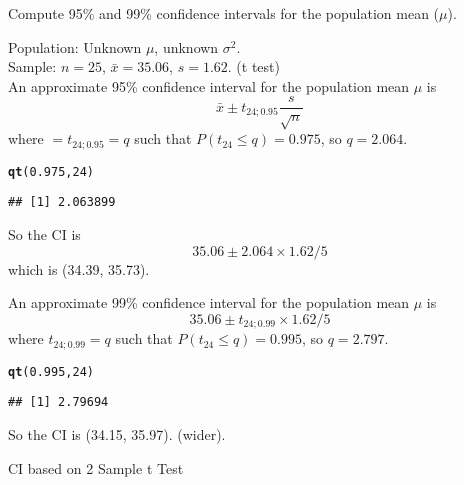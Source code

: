 \documentclass[bigtut]{tutorial}\usepackage[]{graphicx}\usepackage[]{color}
\makeatletter
\newcommand{\hlnum}[1]{\textcolor[rgb]{0.686,0.059,0.569}{#1}}%
\newcommand{\hlstd}[1]{\textcolor[rgb]{0.345,0.345,0.345}{#1}}%
\newcommand{\hlkwd}[1]{\textcolor[rgb]{0.737,0.353,0.396}{\textbf{#1}}}%
\newenvironment{kframe}{%
 \def\at@end@of@kframe{}%
 \ifinner\ifhmode%
  \def\at@end@of@kframe{\end{minipage}}%
  \begin{minipage}{\columnwidth}%
 \fi\fi%
 \def\FrameCommand##1{\hskip\@totalleftmargin \hskip-\fboxsep
 \colorbox{shadecolor}{##1}\hskip-\fboxsep
     \hskip-\linewidth \hskip-\@totalleftmargin \hskip\columnwidth}%
 \MakeFramed {\advance\hsize-\width
   \@totalleftmargin\z@ \linewidth\hsize
   \@setminipage}}%
 {\par\unskip\endMakeFramed%
 \at@end@of@kframe}
\newenvironment{knitrout}{}{} %
\makeatother
\begin{document}
\begin{tutorial}
\begin{questions}
\vspace{.5cm}
Compute 95\% and 99\% confidence intervals for the population mean ($\mu$).


\begin{solution}
Population: Unknown $\mu$, unknown $\sigma^2$. \\
Sample: $n=25$, $\bar{x} = 35.06$, $s=1.62$. (t test) \\

An approximate 95\% confidence interval for the population mean $\mu$ is
\[
\bar x \pm t_{24; 0.95}  \frac{ s }{ \sqrt{n}}
\]
where $=t_{24;0.95} = q$ such that $P(t_{24} \leq q) = 0.975$, so $q=2.064$. \\


\begin{knitrout}
\color{fgcolor}\begin{kframe}
\begin{alltt}
\hlkwd{qt}\hlstd{(}\hlnum{0.975}\hlstd{,}\hlnum{24}\hlstd{)}
\end{alltt}
\begin{verbatim}
## [1] 2.063899
\end{verbatim}
\end{kframe}
\end{knitrout}


So the CI is 
\[  35.06 \pm 2.064  \times 1.62/5\]
which is (34.39, 35.73).

An approximate 99\% confidence interval for the population mean $\mu$ is
\[  35.06 \pm t_{24; 0.99}  \times 1.62/5\]
where $t_{24;0.99} = q$ such that $P(t_{24} \leq q) = 0.995$, so $q=2.797$. \\


\begin{knitrout}
\color{fgcolor}\begin{kframe}
\begin{alltt}
\hlkwd{qt}\hlstd{(}\hlnum{0.995}\hlstd{,}\hlnum{24}\hlstd{)}
\end{alltt}
\begin{verbatim}
## [1] 2.79694
\end{verbatim}
\end{kframe}
\end{knitrout}

So the CI is (34.15, 35.97). (wider).
\end{solution}




\question CI based on 2 Sample t Test \\


\end{questions}
\end{tutorial}
\end{document}
